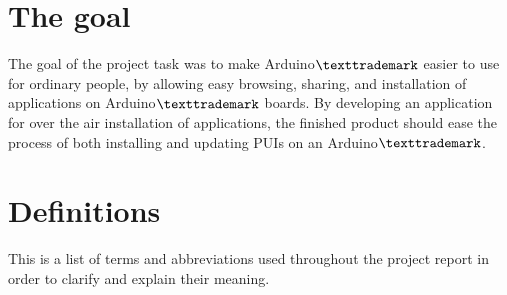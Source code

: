 \section{The goal}
The goal of the project task was to make Arduino$\texttrademark$ easier to use for ordinary people, by allowing easy browsing, sharing, and installation of applications on Arduino$\texttrademark$ boards. By developing an application for over the air installation of applications, the finished product should ease the process of both installing and updating PUIs on an Arduino$\texttrademark$.


\section{Definitions}
This is a list of terms and abbreviations used throughout the project report in order to clarify and explain their meaning.

